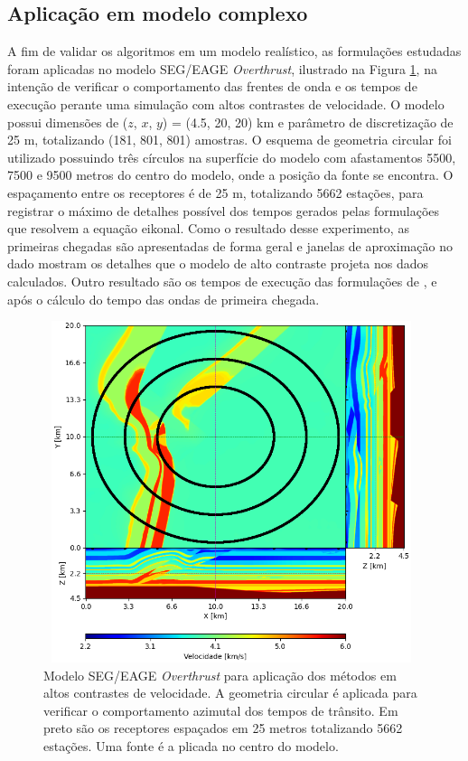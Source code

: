\subsection{Aplicação em modelo complexo}

A fim de validar os algoritmos em um modelo realístico, as formulações estudadas foram aplicadas no modelo SEG/EAGE \textit{Overthrust}, ilustrado na Figura \ref{fig:overthrust}, na intenção de verificar o comportamento das frentes de onda e os tempos de execução perante uma simulação com altos contrastes de velocidade. O modelo possui dimensões de  ($z$, $x$, $y$) = (4.5, 20, 20) km e parâmetro de discretização de 25 m, totalizando (181, 801, 801) amostras. O esquema de geometria circular foi utilizado possuindo três círculos na superfície do modelo com afastamentos 5500, 7500 e 9500 metros do centro do modelo, onde a posição da fonte se encontra. O espaçamento entre os receptores é de 25 m, totalizando 5662 estações, para registrar o máximo de detalhes possível dos tempos gerados pelas formulações que resolvem a equação eikonal. Como o resultado desse experimento, as primeiras chegadas são apresentadas de forma geral e janelas de aproximação no dado mostram os detalhes que o modelo de alto contraste projeta nos dados calculados. Outro resultado são os tempos de execução das formulações de ,  e  após o cálculo do tempo das ondas de primeira chegada. 

\begin{figure}[H]
	\centering
	\includegraphics[width = 11cm, height = 10cm]{Imgs/Metodologia/overthrust.png}
	\caption{Modelo SEG/EAGE \textit{Overthrust} para aplicação dos métodos em altos contrastes de velocidade. A geometria circular é aplicada para verificar o comportamento azimutal dos tempos de trânsito. Em preto são os receptores espaçados em 25 metros totalizando 5662 estações. Uma fonte é a plicada no centro do modelo.}
	\label{fig:overthrust}
\end{figure}


